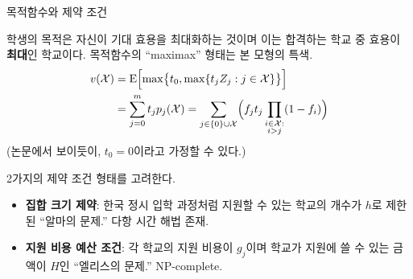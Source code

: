 \documentclass[10pt,slidestop,compress,mathserif,notheorems]{beamer}
\newif\ifen
\theoremstyle{definition}
\theoremstyle{definition}
\begin{document}
\begin{frame}{\ifen Objective function and constraints\else 목적함수와 제약 조건\fi}
\ifen {
The student's objective is to maximize her expected utility, which is the expected value of the \textbf{best} school she gets into. Notice the ``maximax'' form.
\begin{align*}
v(\mathcal{X})
&= \operatorname{E}\Bigl[\max\bigr\{t_0, \max\{t_j Z_j : j \in \mathcal{X}\}\bigr\}\Bigr] \\
&= \sum_{j=0}^m t_j p_j(\mathcal{X}) = \sum_{j\in\{0\}\cup\mathcal{X}} \Bigl( f_j t_j \prod_{\substack{i \in \mathcal{X}: \\ i > j}} (1 - f_{i}) \Bigr)  \label{closedformportfoliovaluationX}%
\end{align*}
(As we show, wlog to assume $t_0 = 0$.)

We consider two kinds of constraints:
\begin{itemize}
\item \textbf{Cardinality constraint}: A limit $h$ on the number of applications, as in Korea's college admissions process. ``Alma's problem,'' solvable in polynomial time.
\item Application \textbf{budget constraint}: Each school has application cost $g_j$, and student has $H$ units to spend on applications. ``Ellis's problem,'' NP-complete.
\end{itemize}
}\else{
학생의 목적은 자신이 기대 효용을 최대화하는 것이며 이는 합격하는 학교 중 효용이 \textbf{최대}인 학교이다. 목적함수의 ``maximax'' 형태는 본 모형의 특색.
\begin{align*}
v(\mathcal{X})
&= \operatorname{E}\Bigl[\max\bigr\{t_0, \max\{t_j Z_j : j \in \mathcal{X}\}\bigr\}\Bigr] \\
&= \sum_{j=0}^m t_j p_j(\mathcal{X}) = \sum_{j\in\{0\}\cup\mathcal{X}} \Bigl( f_j t_j \prod_{\substack{i \in \mathcal{X}: \\ i > j}} (1 - f_{i}) \Bigr)  \label{closedformportfoliovaluationX}%
\end{align*}
(논문에서 보이듯이, $t_0 = 0$이라고 가정할 수 있다.)

2가지의 제약 조건 형태를 고려한다.
\begin{itemize}
\item \textbf{집합 크기 제약}: 한국 정시 입학 과정처럼 지원할 수 있는 학교의 개수가 $h$로 제한된 ``알마의 문제.'' 다항 시간 해법 존재.
\item \textbf{지원 비용 예산 조건}: 각 학교의 지원 비용이 $g_j$이며 학교가 지원에 쓸 수 있는 금액이 $H$인 ``엘리스의 문제.'' NP-complete.
\end{itemize}
}\fi
\end{frame}
\end{document}
